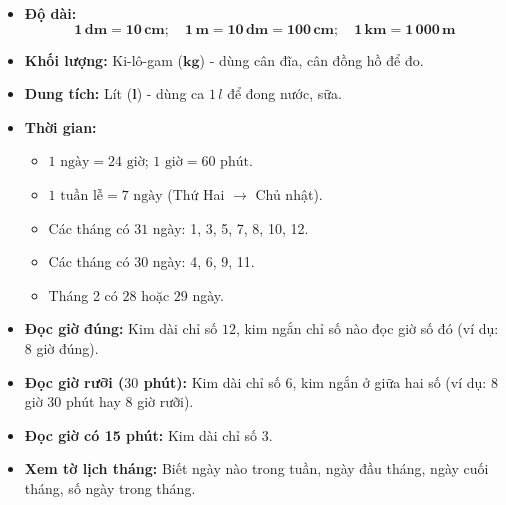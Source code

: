 \documentclass[10pt,a4paper]{article}
\begin{document}
\noindent
\begin{minipage}[t]{0.49\textwidth}\vspace{0pt}
\begin{tcolorbox}[
  enhanced,
  colback=violet!4!white,
  colframe=violet!75!black,
  arc=2mm, boxrule=0.8pt,
  left=2mm, right=2mm, top=1.8mm, bottom=1.8mm,
  title={\footnotesize\bfseries\color{white}\faKey\ 1. Bảng đơn vị đo lường toàn cấp lớp 2}
]
{\footnotesize
\begin{itemize}\setlength{\itemsep}{1pt}\setlength{\leftskip}{-2.5mm}
  \item \textbf{Độ dài:}
  $$\mathbf{1\,dm = 10\,cm}; \quad \mathbf{1\,m = 10\,dm = 100\,cm}; \quad \mathbf{1\,km = 1\,000\,m}$$
  \item \textbf{Khối lượng:} Ki-lô-gam ($\mathbf{kg}$) - dùng cân đĩa, cân đồng hồ để đo.
  \item \textbf{Dung tích:} Lít ($\mathbf{l}$) - dùng ca $1\,l$ để đong nước, sữa.
  \item \textbf{Thời gian:}
  \begin{itemize}\setlength{\itemsep}{0.5pt}\setlength{\leftskip}{-2mm}
    \item $1\text{ ngày} = 24\text{ giờ}$; $1\text{ giờ} = 60\text{ phút}$.
    \item $1\text{ tuần lễ} = 7\text{ ngày}$ (Thứ Hai $\to$ Chủ nhật).
    \item Các tháng có $31$ ngày: 1, 3, 5, 7, 8, 10, 12.
    \item Các tháng có $30$ ngày: 4, 6, 9, 11.
    \item Tháng 2 có $28$ hoặc $29$ ngày.
  \end{itemize}
\end{itemize}
}
\end{tcolorbox}
\end{minipage}
\hfill
\begin{minipage}[t]{0.49\textwidth}\vspace{0pt}
\begin{tcolorbox}[
  enhanced,
  colback=teal!4!white,
  colframe=teal!75!black,
  arc=2mm, boxrule=0.8pt,
  left=2mm, right=2mm, top=1.8mm, bottom=1.8mm,
  title={\footnotesize\bfseries\color{white}\faSliders\ 2. Kĩ năng xem đồng hồ và lịch}
]
{\footnotesize
\begin{itemize}\setlength{\itemsep}{1pt}\setlength{\leftskip}{-2.5mm}
  \item \textbf{Đọc giờ đúng:} Kim dài chỉ số $12$, kim ngắn chỉ số nào đọc giờ số đó (ví dụ: $8$ giờ đúng).
  \item \textbf{Đọc giờ rưỡi ($30$ phút):} Kim dài chỉ số $6$, kim ngắn ở giữa hai số (ví dụ: $8$ giờ $30$ phút hay $8$ giờ rưỡi).
  \item \textbf{Đọc giờ có 15 phút:} Kim dài chỉ số $3$.
  \item \textbf{Xem tờ lịch tháng:} Biết ngày nào trong tuần, ngày đầu tháng, ngày cuối tháng, số ngày trong tháng.
\end{itemize}
}
\end{tcolorbox}
\end{minipage}
\end{document}
